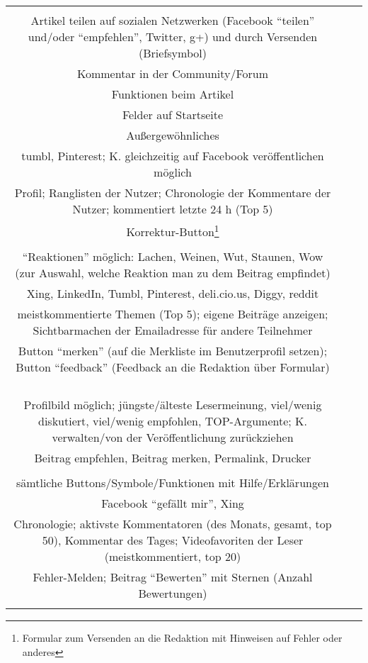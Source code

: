 \begin{landscape}
\begin{tabular}{ccc}
{		
Sonstiges\\ 
Artikel teilen auf sozialen Netzwerken (Facebook ``teilen'' und/oder ``empfehlen'', Twitter, g+) und durch Versenden (Briefsymbol)\\
Kommentar in der Community/Forum\\
Funktionen beim Artikel\\
Felder auf Startseite\\
Außergewöhnliches
&		%
		\\
		tumbl, Pinterest; K. gleichzeitig auf Facebook veröffentlichen möglich \\
		Profil; Ranglisten der Nutzer; Chronologie der Kommentare der Nutzer; kommentiert letzte 24 h (Top 5)\\
		Korrektur-Button\footnote{Formular zum Versenden an die Redaktion mit Hinweisen auf Fehler oder anderes}\\
		\\
		``Reaktionen'' möglich: Lachen, Weinen, Wut, Staunen, Wow (zur Auswahl, welche Reaktion man zu dem Beitrag empfindet)
		&
		\\
		Xing, LinkedIn, Tumbl, Pinterest, deli.cio.us, Diggy, reddit\\
		meistkommentierte Themen (Top 5); eigene Beiträge anzeigen; Sichtbarmachen der Emailadresse für andere Teilnehmer\\
		Button ``merken'' (auf die Merkliste im Benutzerprofil setzen); Button ``feedback'' (Feedback an die Redaktion über Formular) \\
		\\
		\\
		&
		\\
		\\
		Profilbild möglich; jüngste/älteste Lesermeinung, viel/wenig diskutiert, viel/wenig empfohlen, TOP-Argumente; K. verwalten/von der Veröffentlichung zurückziehen\\
		Beitrag empfehlen, Beitrag merken, Permalink, Drucker\\
		\\
		sämtliche Buttons/Symbole/Funktionen mit Hilfe/Erklärungen
		&
		\\
		Facebook ``gefällt mir'', Xing\\
		Chronologie; aktivste Kommentatoren (des Monats, gesamt, top 50), Kommentar des Tages; Videofavoriten der Leser (meistkommentiert, top 20)\\
		Fehler-Melden; Beitrag ``Bewerten'' mit Sternen (Anzahl Bewertungen)\\
}
\end{tabular}
\end{landscape}
